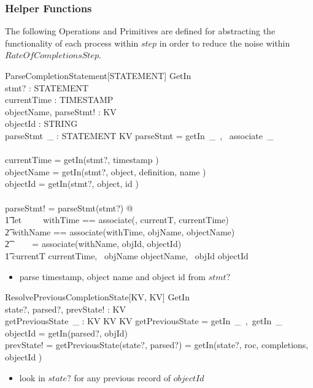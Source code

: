 \documentclass[../main.tex]{subfiles}
\begin{document}
\subsubsection{Helper Functions}
The following Operations and Primitives are defined for abstracting the functionality
of each process within $step$ in order to reduce the noise within $RateOfCompletionsStep$.
\begin{schema}{ParseCompletionStatement[STATEMENT]}
  GetIn \\
  stmt? : STATEMENT \\
  currentTime : TIMESTAMP \\
  objectName, parseStmt! : KV \\
  objectId : STRING \\
  parseStmt~\_ : STATEMENT \bij KV
  \where
  parseStmt = \langle getIn~\_~, ~associate~\_ \rangle {} \esup \\ ~ \\

  currentTime = getIn(stmt?, \langle timestamp \rangle) \\
  objectName = getIn(stmt?, \langle object, definition, name \rangle) \\
  objectId = getIn(stmt?, \langle object, id \rangle) \\ ~ \\

  parseStmt! = parseStmt(stmt?) @ \\
  \t1 let \ ~ ~ withTime == associate(\ldata \rdata, currentT, currentTime) \\
  \t2 withName == associate(withTime, objName, objectName) \\
  \t2 \ \ \ ~ = associate(withName, objId, objectId) \implies \\
  \t1 \ldata currentT \mapsto currentTime, ~objName \mapsto objectName, ~objId \mapsto objectId \rdata
\end{schema}
\begin{itemize}
  \item parse timestamp, object name and object id from $stmt?$
\end{itemize}

\begin{schema}{ResolvePreviousCompletionState[KV, KV]}
  GetIn \\
  state?, parsed?, prevState! : KV \\
  getPreviousState~\_ : KV \cross KV \pfun KV
  \where
  getPreviousState = \langle getIn~\_~,~getIn~\_ \rangle \\

  objectId = getIn(parsed?, objId) \\
  prevState! = getPreviousState(state?, parsed?) = getIn(state?, \langle roc, completions, objectId \rangle)
\end{schema}
\begin{itemize}
  \item look in $state?$ for any previous record of $objectId$
\end{itemize}
\end{document}
